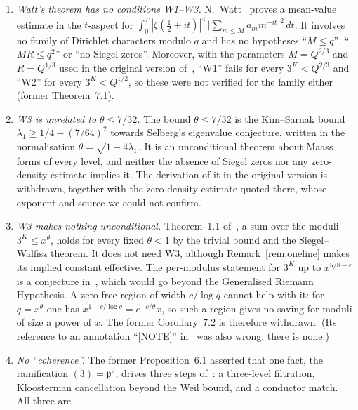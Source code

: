 \documentclass[12pt]{amsart}
\theoremstyle{plain}
\theoremstyle{definition}
\theoremstyle{remark}
\newcommand{\pp}{\mathfrak{p}}        %
\begin{document}
\begin{enumerate}[label=(\arabic*)]
  \item \emph{Watt's theorem has no conditions W1--W3.} N.~Watt~\cite{Watt1995}
    proves a mean-value estimate in the $t$-aspect for
    $\int_0^T|\zeta(\tfrac12+it)|^4\,\bigl|\sum_{m\leq M}a_m m^{-it}\bigr|^2\,dt$.
    It involves no family of Dirichlet characters modulo $q$ and has no
    hypotheses ``$M \leq q$'', ``$MR \leq q^2$'' or ``no Siegel zeros''.
    Moreover, with the parameters $M = Q^{2/3}$ and $R = Q^{1/3}$ used in the
    original version of~\cite{WakilEisenstein}, ``W1'' fails for every
    $3^K < Q^{2/3}$ and ``W2'' for every $3^K < Q^{1/2}$, so these were not
    verified for the family either (former Theorem~7.1).
  \item \emph{W3 is unrelated to $\theta \leq 7/32$.} The bound
    $\theta \leq 7/32$ is the Kim--Sarnak bound~\cite{KimSarnak2003}
    $\lambda_1 \geq 1/4 - (7/64)^2$ towards Selberg's eigenvalue conjecture,
    written in the normalisation $\theta = \sqrt{1 - 4\lambda_1}$. It is an
    unconditional theorem about Maass forms of every level, and neither the
    absence of Siegel zeros nor any zero-density estimate implies it. The
    derivation of it in the original version is withdrawn, together with
    the zero-density estimate quoted there, whose exponent and source we
    could not confirm.
  \item \emph{W3 makes nothing unconditional.} Theorem~1.1
    of~\cite{WakilEisenstein}, a sum over the moduli $3^K \leq x^\theta$,
    holds for every fixed $\theta < 1$ by the trivial bound and the
    Siegel--Walfisz theorem. It does not need W3, although
    Remark~\ref{rem:oneline} makes its implied constant effective. The
    per-modulus statement for $3^K$ up to $x^{5/8-\varepsilon}$ is a conjecture
    in~\cite{WakilEisenstein}, which would go beyond the Generalised Riemann
    Hypothesis. A zero-free region of width $c/\log q$ cannot help with it:
    for $q = x^\theta$ one has $x^{1 - c/\log q} = e^{-c/\theta}x$, so such a
    region gives no saving for moduli of size a power of $x$. The former
    Corollary~7.2 is therefore withdrawn. (Its reference to an annotation
    ``[NOTE]'' in~\cite{WakilEisenstein} was also wrong: there is none.)
  \item \emph{No ``coherence''.} The former Proposition~6.1 asserted that one
    fact, the ramification $(3) = \pp^2$, drives three steps
    of~\cite{WakilEisenstein}: a three-level filtration, Kloosterman
    cancellation beyond the Weil bound, and a conductor match. All three are

\end{enumerate}
\end{document}
